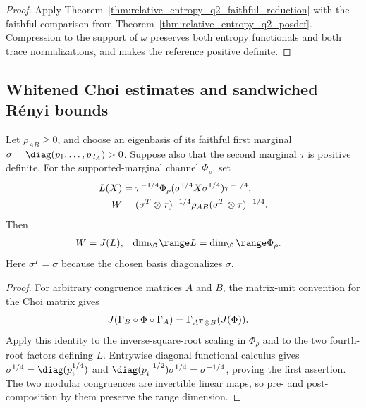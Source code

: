 \begin{proof}\leanok
    Apply Theorem~\ref{thm:relative_entropy_q2_faithful_reduction} with the
    faithful comparison from Theorem~\ref{thm:relative_entropy_q2_posdef}.
    Compression to the support of $\omega$ preserves both entropy functionals
    and both trace normalizations, and makes the reference positive definite.
\end{proof}
\subsection{Whitened Choi estimates and sandwiched R\'enyi bounds}

\begin{theorem}
    \label{thm:full_support_eigenbasis_whitening_choi}
    \leanok
    Let $\rho_{AB}\geq0$, and choose an eigenbasis of its faithful first
    marginal
    $\sigma=\diag(p_1,\ldots,p_{d_A})>0$.  Suppose also that the second
    marginal $\tau$ is positive definite.  For the supported-marginal channel
    $\Phi_\rho$, set
    \begin{align}
        L(X) & =\tau^{-1/4}
        \Phi_\rho(\sigma^{1/4}X\sigma^{1/4})\tau^{-1/4}, \\
        W    & =(\sigma^T\otimes\tau)^{-1/4}\rho_{AB}
        (\sigma^T\otimes\tau)^{-1/4}.
        \notag
    \end{align}
    Then
    \begin{align}
        W & =J(L),
          & \dim_{\C}\range L & =\dim_{\C}\range\Phi_\rho.
        \notag
    \end{align}
    Here $\sigma^T=\sigma$ because the chosen basis diagonalizes $\sigma$.
\end{theorem}

\begin{proof}\leanok
    For arbitrary congruence matrices $A$ and $B$, the matrix-unit convention
    for the Choi matrix gives
    \begin{align}
        J(\Gamma_B\circ\Phi\circ\Gamma_A)
         & =\Gamma_{A^T\otimes B}(J(\Phi)).
        \notag
    \end{align}
    Apply this identity to the inverse-square-root scaling in
    $\Phi_\rho$ and to the two fourth-root factors defining $L$.
    Entrywise diagonal functional calculus gives
    $\sigma^{1/4}=\diag(p_i^{1/4})$ and
    $\diag(p_i^{-1/2})\sigma^{1/4}=\sigma^{-1/4}$, proving the first
    assertion.  The two modular congruences are invertible linear maps, so
    pre- and post-composition by them preserve the range dimension.
\end{proof}

